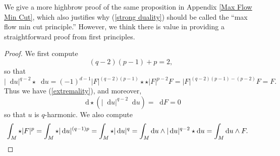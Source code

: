 \documentclass[reqno,11pt]{amsart}
\newcommand{\RR}{\mathbf{R}}
\newcommand*\dif{\mathop{}\!\mathrm{d}}
\newtheorem{proposition}[theorem]{Proposition}
\theoremstyle{definition}
\numberwithin{equation}{section}
\begin{document}
We give a more highbrow proof of the same proposition in Appendix \ref{Max Flow Min Cut}, which also justifies why (\ref{strong duality}) should be called the ``max flow min cut principle.''
However, we think there is value in providing a straightforward proof from first principles.

\begin{proof}
We first compute 
$$(q - 2)(p - 1) + p = 2,$$
so that
$$|\dif u|^{q - 2} \star \dif u = (-1)^{d - 1} |F|^{(q - 2)(p - 1)} \star \star |F|^{p - 2} F = |F|^{(q - 2)(p - 1) - (p - 2)} F = F.$$
Thus we have (\ref{extremality}), and moreover,
$$\dif \star (|\dif u|^{q - 2} \dif u) = \dif F = 0$$
so that $u$ is $q$-harmonic.
We also compute 
\begin{align*}
\int_M \star |F|^p &= \int_M \star |\dif u|^{(q - 1)p} = \int_M \star |\dif u|^q = \int_M \dif u \wedge |\dif u|^{q - 2} \star \dif u = \int_M \dif u \wedge F. \qedhere 
\end{align*}
\end{proof}




\end{document}
